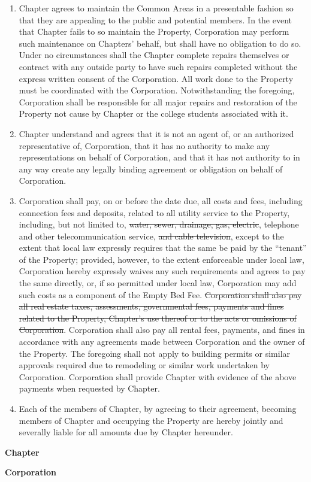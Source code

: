 \documentclass[12pt]{article}
\begin{document}
\begin{enumerate}
        \item Chapter agrees to maintain the Common Areas in a presentable fashion so that they are appealing to the public and potential members.
                In the event that Chapter fails to so maintain the Property, Corporation may perform such maintenance on Chapters' behalf, but shall have no obligation to do so.
                Under no circumstances shall the Chapter complete repairs themselves or contract with any outside party to have such repairs completed without the express written consent of the Corporation.
                All work done to the Property must be coordinated with the Corporation.
                Notwithstanding the foregoing, Corporation shall be responsible for all major repairs and restoration of the Property not cause by Chapter or the college students associated with it.

        \item Chapter understand and agrees that it is not an agent of, or an authorized representative of, Corporation, that it has no authority to make any representations on behalf of Corporation, and that it has not authority to in any way create any legally binding agreement or obligation on behalf of Corporation.

        \item Corporation shall pay, on or before the date due, all costs and fees, including connection fees and deposits, related to all utility service to the Property, including, but not limited to, \st{water, sewer, drainage, gas, electric}, telephone and other telecommunication service, \st{and cable television}, except to the extent that local law expressly requires that the same be paid by the ``tenant'' of the Property; provided, however, to the extent enforceable under local law, Corporation hereby expressly waives any such requirements and agrees to pay the same directly, or, if so permitted under local law, Corporation may add such costs as a component of the Empty Bed Fee.
                \st{Corporation shall also pay all real estate taxes, assessments, governmental fees, payments and fines related to the Property, Chapter's use thereof or to the acts or omissions of Corporation}.
                Corporation shall also pay all rental fees, payments, and fines in accordance with any agreements made between Corporation and the owner of the Property.
                The foregoing shall not apply to building permits or similar approvals required due to remodeling or similar work undertaken by Corporation.  Corporation shall provide Chapter with evidence of the above payments when requested by Chapter.
        \item Each of the members of Chapter, by agreeing to their agreement, becoming members of Chapter and occupying the Property are hereby jointly and severally liable for all amounts due by Chapter hereunder.
\end{enumerate}

\clearpage
\textbf{\large Chapter}

\signature{President}

\signature{Risk Manager}

\signature{House Manager}

\clearpage
\textbf{\large Corporation}

\signature{President}
\end{document}
